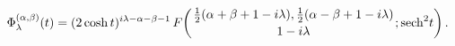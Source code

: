 \[\Phi^{(\alpha,\beta)}_{\lambda}(t)=(2\mathop{\cosh\/}\nolimits t)^{i\lambda-%
\alpha-\beta-1}\mathop{F\/}\nolimits\!\left({\tfrac{1}{2}(\alpha+\beta+1-i%
\lambda),\tfrac{1}{2}(\alpha-\beta+1-i\lambda)\atop 1-i\lambda};{\mathop{%
\mathrm{sech}\/}\nolimits^{2}}t\right).\]